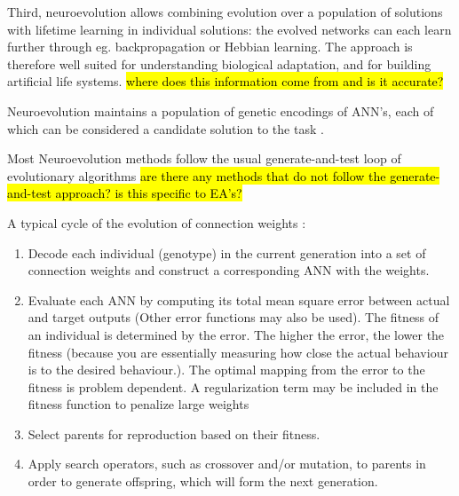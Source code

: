 Third, neuroevolution allows combining evolution over a population of solutions with lifetime learning in individual solutions: the evolved networks can each learn further through eg. backpropagation or Hebbian learning. The approach is therefore well suited for understanding biological adaptation, and for building artificial life systems. \hl{where does this information come from and is it accurate?}


Neuroevolution maintains a population of genetic encodings of ANN's, each of which can be considered a candidate solution to the task \cite{Miikkulainen2010}.

Most Neuroevolution methods follow the usual generate-and-test loop of evolutionary algorithms \hl{are there any methods that do not follow the generate-and-test approach? is this specific to EA's?	}


A typical cycle of the evolution of connection weights \cite{XinYao1999}:
\begin{enumerate}
	\item Decode each individual (genotype) in the current generation into a set of connection weights and construct a corresponding ANN with the weights.
	\item Evaluate each ANN by computing its total mean square error between actual and target outputs (Other error functions may also be used). The fitness of an individual is determined by the error. The higher the error, the lower the fitness (because you are essentially measuring how close the actual behaviour is to the desired behaviour.). The optimal mapping from the error to the fitness is problem dependent. A regularization term may be included in the fitness function to penalize large weights
	\item Select parents for reproduction based on their fitness.
	\item Apply search operators, such as crossover and/or mutation, to parents in order to generate offspring, which will form the next generation.
\end{enumerate}


